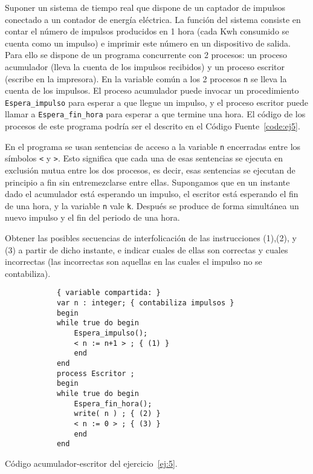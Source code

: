 \begin{ejercicio} \label{ej:5}
    Suponer un sistema de tiempo real que dispone de un captador de impulsos conectado a un
    contador de energía eléctrica. La función del sistema consiste en contar el número de impulsos
    producidos en 1 hora (cada Kwh consumido se cuenta como un impulso) e imprimir este número
    en un dispositivo de salida. Para ello se dispone de un programa concurrente con 2 procesos: un
    proceso acumulador (lleva la cuenta de los impulsos recibidos) y un proceso escritor (escribe
    en la impresora). En la variable común a los 2 procesos \verb|n| se lleva la cuenta de los impulsos. El
    proceso acumulador puede invocar un procedimiento \verb|Espera_impulso| para esperar a que llegue
    un impulso, y el proceso escritor puede llamar a \verb|Espera_fin_hora| para esperar a que termine
    una hora. El código de los procesos de este programa podría ser el descrito en el Código Fuente~\ref{code:ej5}.
    \begin{observacion}
        En el programa se usan sentencias de acceso a la variable \verb|n| encerradas entre los símbolos \verb|<| y
        \verb|>|. Esto significa que cada una de esas sentencias se ejecuta en exclusión mutua entre los dos
        procesos, es decir, esas sentencias se ejecutan de principio a fin sin entremezclarse entre ellas.
        Supongamos que en un instante dado el acumulador está esperando un impulso, el escritor está
        esperando el fin de una hora, y la variable \verb|n| vale \verb|k|. Después se produce de forma simultánea
        un nuevo impulso y el fin del periodo de una hora.
    \end{observacion}

    Obtener las posibles secuencias de interfolicación de las instrucciones (1),(2), y (3) a partir de
    dicho instante, e indicar cuales de ellas son correctas y cuales incorrectas (las incorrectas son
    aquellas en las cuales el impulso no se contabiliza).
    \begin{listing}
        \begin{verbatim}
            { variable compartida: }
            var n : integer; { contabiliza impulsos }
            begin
            while true do begin
                Espera_impulso();
                < n := n+1 > ; { (1) }
                end
            end
            process Escritor ;
            begin
            while true do begin
                Espera_fin_hora();
                write( n ) ; { (2) }
                < n := 0 > ; { (3) }
                end
            end
        \end{verbatim}
        \caption{Código acumulador-escritor del ejercicio~\ref{ej:5}.}
        \label{code:ej5}
    \end{listing}


\end{ejercicio}
